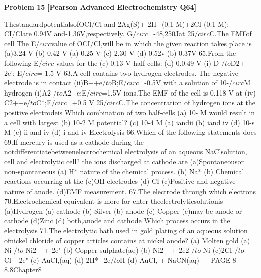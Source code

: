 \begin{problembox}
\textbf{Problem 15} \hfill \textbf{[Pearson Advanced Electrochemistry Q64]}
\label{q:ext-pearson-15}

ThestandardpotentialsofOCl/Cl and
2Ag(S)+ 2H+(0.1 M)+2CI (0.1 M);
CI/Clare 0.94V and-1.36V,respectively.
G$/circ$=-48,250Jat 25$/circ$C.The EMFof cell
The E$/circ$value of OCI/Cl,will be
in which the given reaction takes place is
(a)3.24 V
(b)-0.42 V
(a) 0.25 V
(c)-2.30 V
(d) 0.52v
(b) 0.37V
65.From the following E$/circ$ values for the
(c) 0.13 V
half-cells:
(d) 0.0.49 V
(i) D $/to$D$2$+ 2e'; E$/circ$=-1.5 V
63.A cell contains two hydrogen electrodes.
The negative electrode is in contact
(ii)B++e$/to$B;E$/circ$=-0.5V
with a solution of 10-$/circ$M hydrogen
(i)A$2$-$/to$A$2$+e;E$/circ$=1.5V
ions.The EMF of the cell is 0.118 V at
(iv) C$2$++e$/to$C*;E$/circ$=+0.5 V
25$/circ$C.The concentration of hydrogen
ions at the positive electrodeis
Which combination of two half-cells
(a) 10- M
would result in a cell with largest
(b) 10-$2$ M
potential?
(c) 10-4 M
(a) iandii
(b) iand iv
(d) 10-s M
(c) ii and iv
(d) i and iv
Electrolysis
66.Which of the following statements does
69.If mercury is used as a cathode during the
notdifferentiatebetweenelectrochemical
electrolysis of an aqueous NaClsolution,
cell and electrolytic cell?
the ions discharged at cathode are
(a)Spontaneousor non-spontaneous
(a) H*
nature of the chemical process.
(b) Na*
(b) Chemical reactions occurring at the
(c)OH
electrodes
(d) CI
(c)Positive and negative nature of anode.
(d)EMF measurement.
67.The electrode through which electrons
70.Electrochemical equivalent is more for
enter theelectrolyticsolutionis
(a)Hydrogen
(a) cathode
(b) Silver
(b) anode
(c) Copper
(c)may be anode or cathode
(d)Zinc
(d) both,anode and cathode
Which process occurs in the electrolysis
71.The electrolytic bath used in gold plating
of an aqueous solution ofnickel chloride
of copper articles contains
at nickel anode?
(a) Molten gold
(a) Ni $/to$ Ni2+ + 2e"
(b) Copper sulphate(aq)
(b) Ni$2$+ + 2e$2$ $/to$ Ni
(c)2CI $/to$ Cl+ 2e"
(c) AuCl,(aq)
(d) 2H*+2e$/to$H
(d) AuCl, + NaCN(aq)
--- PAGE 8 ---
8.8Chapter8
\end{problembox}

